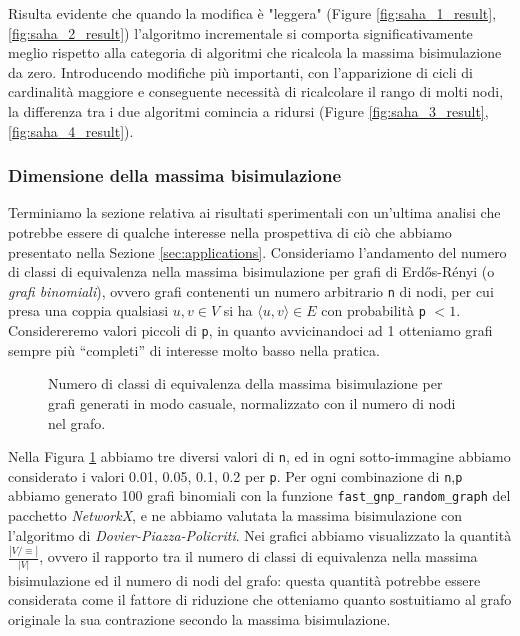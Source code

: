 Risulta evidente che quando la modifica è "leggera" (Figure \ref{fig:saha_1_result}, \ref{fig:saha_2_result}) l'algoritmo incrementale si comporta significativamente meglio rispetto alla categoria di algoritmi che ricalcola la massima bisimulazione da zero. Introducendo modifiche più importanti, con l'apparizione di cicli di cardinalità maggiore e conseguente necessità di ricalcolare il rango di molti nodi, la differenza tra i due algoritmi comincia a ridursi (Figure \ref{fig:saha_3_result}, \ref{fig:saha_4_result}).

\subsubsection{Dimensione della massima bisimulazione}
Terminiamo la sezione relativa ai risultati sperimentali con un'ultima analisi che potrebbe essere di qualche interesse nella prospettiva di ciò che abbiamo presentato nella Sezione \ref{sec:applications}. Consideriamo l'andamento del numero di classi di equivalenza nella massima bisimulazione per grafi di Erdős-Rényi (o \emph{grafi binomiali}), ovvero grafi contenenti un numero arbitrario \verb|n| di nodi, per cui presa una coppia qualsiasi $u,v \in V$ si ha $\langle u,v\rangle \in E$ con probabilità \verb|p| $< 1$.
Considereremo valori piccoli di \verb|p|, in quanto avvicinandoci ad 1 otteniamo grafi sempre più ``completi'' di interesse molto basso nella pratica.

\begin{figure}[b!]
    \caption{Numero di classi di equivalenza della massima bisimulazione per grafi generati in modo casuale, normalizzato con il numero di nodi nel grafo.}
    \label{fig:bisi_size}
\end{figure}

Nella Figura \ref{fig:bisi_size} abbiamo tre diversi valori di \verb|n|, ed in ogni sotto-immagine abbiamo considerato i valori 0.01, 0.05, 0.1, 0.2 per \verb|p|. Per ogni combinazione di \verb|n|,\verb|p| abbiamo generato 100 grafi binomiali con la funzione \verb|fast_gnp_random_graph| del pacchetto \emph{NetworkX}, e ne abbiamo valutata la massima bisimulazione con l'algoritmo di \emph{Dovier-Piazza-Policriti}. Nei grafici abbiamo visualizzato la quantità $\frac{|V / \equiv|}{|V|}$, ovvero il rapporto tra il numero di classi di equivalenza nella massima bisimulazione ed il numero di nodi del grafo: questa quantità potrebbe essere considerata come il fattore di riduzione che otteniamo quanto sostuitiamo al grafo originale la sua contrazione secondo la massima bisimulazione.


